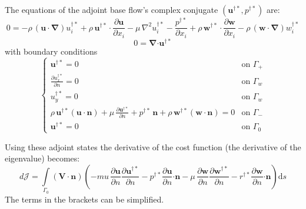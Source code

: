 \documentclass[12pt, a4paper]{article}
\begin{document}
    The equations of the adjoint base flow's complex conjugate $(\mathbf{u^{\dagger*}}, p^{\dagger*})$ are:
    \begin{equation}
        0 = - \rho \, (\mathbf{u \cdot} \boldsymbol{\nabla}) u^{\dagger*}_i + 
            \rho \, \mathbf{u^{\dagger*} \cdot} \frac{\partial \mathbf{u}}{\partial x_i} - 
            \mu \, \nabla^2 u^{\dagger*}_i - 
            \frac{p^{\dagger*}}{\partial x_i} + 
            \rho \, \mathbf{w^{\dagger*} \cdot} \frac{\partial \mathbf{w}}{\partial x_i} - 
            \rho \, (\mathbf{w \cdot} \boldsymbol{\nabla}) w^{\dagger*}_i
    \end{equation}
    \begin{equation}
        0 = \boldsymbol{\nabla} \mathbf{\cdot u^{\dagger*}}
    \end{equation}
    with boundary conditions
    \begin{equation}
    \begin{cases}
        \mathbf{u^{\dagger*}} = 0 & \text{on } \Gamma_+ \\
        \frac{\partial u^{\dagger*}_x}{\partial n} = 0 & \text{on } \Gamma_w \\
        u^{\dagger*}_y = 0 & \text{on } \Gamma_w \\
        \rho \, \mathbf{u^{\dagger*}} (\mathbf{u \cdot n}) + \mu \, \frac{\partial \mathbf{u^{\dagger*}}}{\partial n} + 
        p^{\dagger*} \, \mathbf{n} + \rho \, \mathbf{w^{\dagger*}} (\mathbf{w \cdot n}) = 0 & \text{on } \Gamma_- \\
        \mathbf{u^{\dagger*}} = 0 & \text{on } \Gamma_0
    \end{cases}
    \end{equation}
    
    Using these adjoint states the derivative of the cost function (the derivative of the eigenvalue) becomes:
    \begin{equation}
        d \mathcal{J} = \int\limits_{\Gamma_0} (\mathbf{V \cdot n}) \left( 
            -mu \, \frac{\partial \mathbf{u}}{\partial n} \frac{\partial \mathbf{u^{\dagger*}}}{\partial n} - 
            p^{\dagger*} \frac{\partial \mathbf{u}}{\partial n} \mathbf{\cdot n} - 
            \mu \, \frac{\partial \mathbf{w}}{\partial n} \frac{\partial \mathbf{w^{\dagger*}}}{\partial n} - 
            r^{\dagger*} \frac{\partial \mathbf{w}}{\partial n} \mathbf{\cdot n}
        \right) \mathrm{d} s
    \end{equation}
    The terms in the brackets can be simplified.
    
\end{document}
